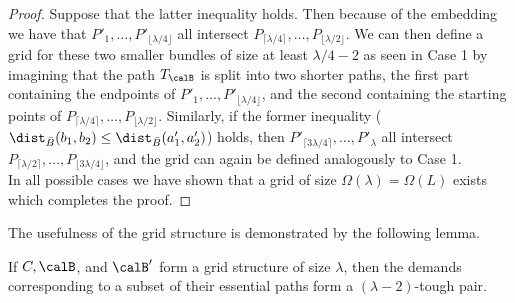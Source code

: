 \begin{proof}
Suppose that the latter inequality holds. Then because of the embedding we have that $P'_1,\dots,P'_{\lfloor \lambda/4\rfloor}$ all intersect $P_{\lceil \lambda/4 \rceil},\dots, P_{\lfloor \lambda/2 \rfloor}$. We can then define a grid for these two smaller bundles of size at least $\lambda/4-2$ as seen in Case 1 by imagining that the path $T_\calB$ is split into two shorter paths, the first part containing the endpoints of $P'_1,\dots,P'_{\lfloor \lambda/4\rfloor}$, and the second containing the starting points of $P_{\lceil \lambda/4 \rceil},\dots, P_{\lfloor \lambda/2 \rfloor}$. Similarly, if the former inequality ($\dist_{\bar B}(b_1,b_2) \leq \dist_{\bar B}(a'_1,a'_2)$) holds, then $P'_{\lceil 3\lambda/4 \rceil},\dots,P'_{\lambda}$ all intersect $P_{\lceil \lambda/2 \rceil},\dots, P_{\lfloor 3\lambda/4 \rfloor}$, and the grid can again be defined analogously to Case 1.\\

In all possible cases we have shown that a grid of size $\Omega(\lambda)=\Omega(L)$ exists which completes the proof.
\end{proof}

The usefulness of the grid structure is demonstrated by the following lemma.

\begin{lemma}\label{lem:gridsarehard}
If $C,\calB$, and $\calB'$ form a grid structure of size $\lambda$, then the demands corresponding to a subset of their essential paths form a  $(\lambda-2)$-tough pair.
\end{lemma}

